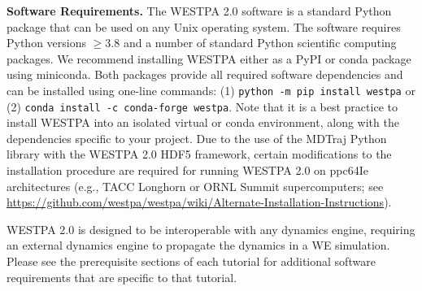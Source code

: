 \textbf{Software Requirements.} 
The WESTPA 2.0 software is a standard Python package that can be used on any Unix operating system. 
The software requires Python versions $\geq$3.8 and a number of standard Python scientific computing packages. 
We recommend installing WESTPA either as a PyPI or conda package using miniconda. 
Both packages provide all required software dependencies and can be installed using one-line commands: (1) \verb|python -m pip install westpa| or (2) \verb|conda install -c conda-forge westpa|. 
Note that it is a best practice to install WESTPA into an isolated virtual or conda environment, along with the dependencies specific to your project. 
Due to the use of the MDTraj Python library with the WESTPA 2.0 HDF5 framework, certain modifications to the installation procedure are required for running WESTPA 2.0 on ppc64Ie architectures (e.g., TACC Longhorn or ORNL Summit supercomputers; see {\url{https://github.com/westpa/westpa/wiki/Alternate-Installation-Instructions}}). 

WESTPA 2.0 is designed to be interoperable with any dynamics engine, requiring an external dynamics engine to propagate the dynamics in a WE simulation.
Please see the prerequisite sections of each tutorial for additional software requirements that are specific to that tutorial.

